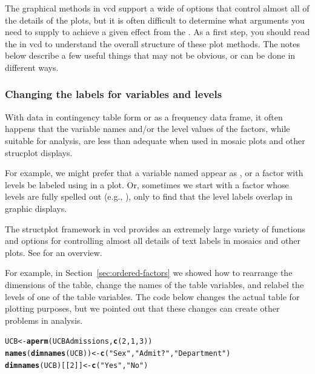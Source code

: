 \documentclass[10pt,twoside]{article}\usepackage[]{graphicx}\usepackage[]{color}
\makeatletter
\newcommand{\hlnum}[1]{\textcolor[rgb]{0.686,0.059,0.569}{#1}}%
\newcommand{\hlstr}[1]{\textcolor[rgb]{0.192,0.494,0.8}{#1}}%
\newcommand{\hlstd}[1]{\textcolor[rgb]{0.345,0.345,0.345}{#1}}%
\newcommand{\hlkwb}[1]{\textcolor[rgb]{0.69,0.353,0.396}{#1}}%
\newcommand{\hlkwd}[1]{\textcolor[rgb]{0.737,0.353,0.396}{\textbf{#1}}}%
\newenvironment{kframe}{%
 \def\at@end@of@kframe{}%
 \ifinner\ifhmode%
  \def\at@end@of@kframe{\end{minipage}}%
  \begin{minipage}{\columnwidth}%
 \fi\fi%
 \def\FrameCommand##1{\hskip\@totalleftmargin \hskip-\fboxsep
 \colorbox{shadecolor}{##1}\hskip-\fboxsep
     \hskip-\linewidth \hskip-\@totalleftmargin \hskip\columnwidth}%
 \MakeFramed {\advance\hsize-\width
   \@totalleftmargin\z@ \linewidth\hsize
   \@setminipage}}%
 {\par\unskip\endMakeFramed%
 \at@end@of@kframe}
\newenvironment{knitrout}{}{} %
\newcommand{\secref}[1]{Section~\ref{#1}}
\newcommand{\pkg}[1]{{\normalfont\fontseries{b}\selectfont #1}}
\makeatother
\begin{document}
The graphical methods in \pkg{vcd}  support a wide of options that control almost all of the details
of the plots, but it is often difficult to determine what arguments you need to supply
to achieve a given effect from the .  As a first step, you should read the 
 in \pkg{vcd} to understand the overall structure of
these plot methods.  The notes below describe a few useful things that may not be obvious,
or can be done in different ways.

\subsubsection[Changing labels]{Changing the labels for variables and levels}
With data in contingency table form or as a frequency data frame, it often happens
that the variable names and/or the level values of the factors, while suitable
for analysis, are less than adequate when used in mosaic plots and other strucplot
displays.  

For example, we might prefer that a variable named  appear
as , or a factor with levels 
be labeled using  in a plot.  Or, sometimes we
start with a factor whose levels are fully spelled out
(e.g., ),
only to find that the level labels overlap in graphic displays.

The structplot framework in \pkg{vcd} provides an extremely large variety of
functions and options for controlling almost all details of text labels in mosaics
and other plots.  See  for an overview. 

For example, in \secref{sec:ordered-factors} we showed how to rearrange the dimensions
of the  table, change the names of the table variables, and
relabel the levels of one of the table variables.
The code below changes the actual table for plotting purposes, but we pointed out that
these changes can create other problems in analysis.

\begin{knitrout}
\color{fgcolor}\begin{kframe}
\begin{alltt}
\hlstd{UCB} \hlkwb{<-} \hlkwd{aperm}\hlstd{(UCBAdmissions,} \hlkwd{c}\hlstd{(}\hlnum{2}\hlstd{,} \hlnum{1}\hlstd{,} \hlnum{3}\hlstd{))}
\hlkwd{names}\hlstd{(}\hlkwd{dimnames}\hlstd{(UCB))} \hlkwb{<-} \hlkwd{c}\hlstd{(}\hlstr{"Sex"}\hlstd{,} \hlstr{"Admit?"}\hlstd{,} \hlstr{"Department"}\hlstd{)}
\hlkwd{dimnames}\hlstd{(UCB)[[}\hlnum{2}\hlstd{]]} \hlkwb{<-} \hlkwd{c}\hlstd{(}\hlstr{"Yes"}\hlstd{,} \hlstr{"No"}\hlstd{)}
\end{alltt}
\end{kframe}
\end{knitrout}
\end{document}
